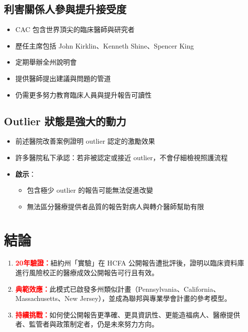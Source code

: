 \documentclass[12pt,a4paper]{article}
\begin{document}
\subsection{利害關係人參與提升接受度}

\begin{itemize}
    \item CAC 包含世界頂尖的臨床醫師與研究者
    \item 歷任主席包括 John Kirklin、Kenneth Shine、Spencer King
    \item 定期舉辦全州說明會
    \item 提供醫師提出建議與問題的管道
    \item 仍需更多努力教育臨床人員與提升報告可讀性
\end{itemize}

\subsection{Outlier 狀態是強大的動力}

\begin{itemize}
    \item 前述醫院改善案例證明 outlier 認定的激勵效果
    \item 許多醫院私下承認：若非被認定或接近 outlier，不會仔細檢視照護流程
    \item \textbf{啟示}：
    \begin{itemize}
        \item 包含極少 outlier 的報告可能無法促進改變
        \item 無法區分醫療提供者品質的報告對病人與轉介醫師幫助有限
    \end{itemize}
\end{itemize}

\section{結論}

\begin{enumerate}
    \item \textcolor{red}{\textbf{20年驗證：}}紐約州「實驗」在 HCFA 公開報告遭批評後，證明以臨床資料庫進行風險校正的醫療成效公開報告可行且有效。

    \item \textcolor{red}{\textbf{典範效應：}}此模式已啟發多州類似計畫（Pennsylvania、California、Massachusetts、New Jersey），並成為聯邦與專業學會計畫的參考模型。

    \item \textcolor{red}{\textbf{持續挑戰：}}如何使公開報告更準確、更具資訊性、更能造福病人、醫療提供者、監管者與政策制定者，仍是未來努力方向。
\end{enumerate}
\end{document}
